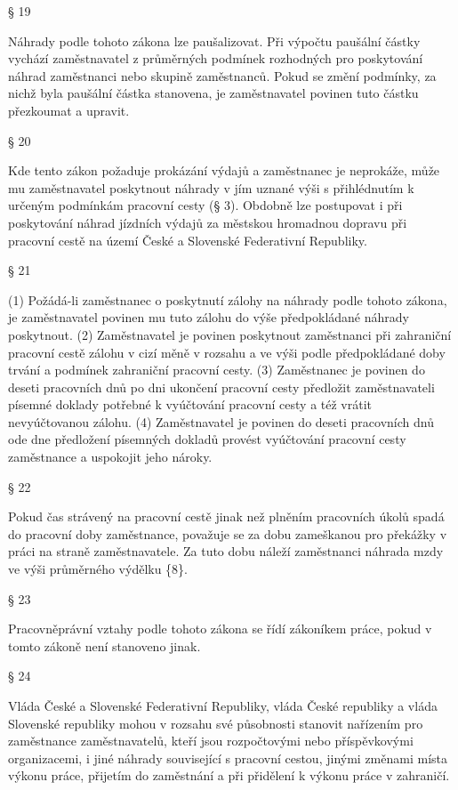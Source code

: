 \documentclass[11pt,a4paper]{article}
\begin{document}
§ 19

Náhrady podle tohoto zákona lze paušalizovat. Při výpočtu paušální částky vychází zaměstnavatel z průměrných podmínek rozhodných pro poskytování náhrad zaměstnanci nebo skupině zaměstnanců. Pokud se změní podmínky, za nichž byla paušální částka stanovena, je zaměstnavatel povinen tuto částku přezkoumat a upravit.

§ 20

Kde tento zákon požaduje prokázání výdajů a zaměstnanec je neprokáže, může mu zaměstnavatel poskytnout náhrady v jím uznané výši s přihlédnutím k určeným podmínkám pracovní cesty (§ 3). Obdobně lze postupovat i při poskytování náhrad jízdních výdajů za městskou hromadnou dopravu při pracovní cestě na území České a Slovenské Federativní Republiky.

§ 21

(1) Požádá-li zaměstnanec o poskytnutí zálohy na náhrady podle tohoto zákona, je zaměstnavatel povinen mu tuto zálohu do výše předpokládané náhrady poskytnout. (2) Zaměstnavatel je povinen poskytnout zaměstnanci při zahraniční pracovní cestě zálohu v cizí měně v rozsahu a ve výši podle předpokládané doby trvání a podmínek zahraniční pracovní cesty. (3) Zaměstnanec je povinen do deseti pracovních dnů po dni ukončení pracovní cesty předložit zaměstnavateli písemné doklady potřebné k vyúčtování pracovní cesty a též vrátit nevyúčtovanou zálohu. (4) Zaměstnavatel je povinen do deseti pracovních dnů ode dne předložení písemných dokladů provést vyúčtování pracovní cesty zaměstnance a uspokojit jeho nároky.

§ 22

Pokud čas strávený na pracovní cestě jinak než plněním pracovních úkolů spadá do pracovní doby zaměstnance, považuje se za dobu zameškanou pro překážky v práci na straně zaměstnavatele. Za tuto dobu náleží zaměstnanci náhrada mzdy ve výši průměrného výdělku \{8\}.

§ 23

Pracovněprávní vztahy podle tohoto zákona se řídí zákoníkem práce, pokud v tomto zákoně není stanoveno jinak.

§ 24

Vláda České a Slovenské Federativní Republiky, vláda České republiky a vláda Slovenské republiky mohou v rozsahu své působnosti stanovit nařízením pro zaměstnance zaměstnavatelů, kteří jsou rozpočtovými nebo příspěvkovými organizacemi, i jiné náhrady související s pracovní cestou, jinými změnami místa výkonu práce, přijetím do zaměstnání a při přidělení k výkonu práce v zahraničí.
\end{document}
